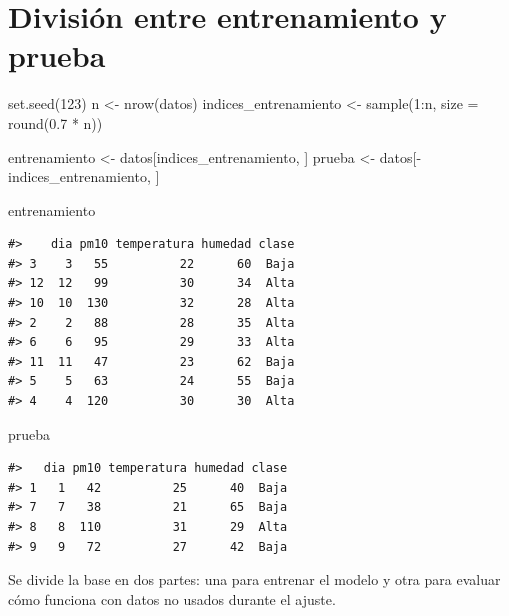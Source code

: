 \documentclass[
  spanish,
  10.5pt,
  letterpaper,
  openany,
  headings=big]{scrbook}
\newenvironment{Shaded}{}{}
\newcommand{\AttributeTok}[1]{\textcolor[rgb]{0.84,0.23,0.29}{#1}}
\newcommand{\DecValTok}[1]{\textcolor[rgb]{0.00,0.36,0.77}{#1}}
\newcommand{\FloatTok}[1]{\textcolor[rgb]{0.00,0.36,0.77}{#1}}
\newcommand{\FunctionTok}[1]{\textcolor[rgb]{0.44,0.26,0.76}{#1}}
\newcommand{\NormalTok}[1]{\textcolor[rgb]{0.14,0.16,0.18}{#1}}
\newcommand{\OtherTok}[1]{\textcolor[rgb]{0.44,0.26,0.76}{#1}}
\newcommand{\SpecialCharTok}[1]{\textcolor[rgb]{0.00,0.36,0.77}{#1}}
\begin{document}
\section{División entre entrenamiento y
prueba}\label{divisiuxf3n-entre-entrenamiento-y-prueba}

\begin{Shaded}
\begin{Highlighting}[]
\FunctionTok{set.seed}\NormalTok{(}\DecValTok{123}\NormalTok{)}
\NormalTok{n }\OtherTok{\textless{}{-}} \FunctionTok{nrow}\NormalTok{(datos)}
\NormalTok{indices\_entrenamiento }\OtherTok{\textless{}{-}} \FunctionTok{sample}\NormalTok{(}\DecValTok{1}\SpecialCharTok{:}\NormalTok{n, }\AttributeTok{size =} \FunctionTok{round}\NormalTok{(}\FloatTok{0.7} \SpecialCharTok{*}\NormalTok{ n))}

\NormalTok{entrenamiento }\OtherTok{\textless{}{-}}\NormalTok{ datos[indices\_entrenamiento, ]}
\NormalTok{prueba }\OtherTok{\textless{}{-}}\NormalTok{ datos[}\SpecialCharTok{{-}}\NormalTok{indices\_entrenamiento, ]}

\NormalTok{entrenamiento}
\end{Highlighting}
\end{Shaded}

\begin{verbatim}
#>    dia pm10 temperatura humedad clase
#> 3    3   55          22      60  Baja
#> 12  12   99          30      34  Alta
#> 10  10  130          32      28  Alta
#> 2    2   88          28      35  Alta
#> 6    6   95          29      33  Alta
#> 11  11   47          23      62  Baja
#> 5    5   63          24      55  Baja
#> 4    4  120          30      30  Alta
\end{verbatim}

\begin{Shaded}
\begin{Highlighting}[]
\NormalTok{prueba}
\end{Highlighting}
\end{Shaded}

\begin{verbatim}
#>   dia pm10 temperatura humedad clase
#> 1   1   42          25      40  Baja
#> 7   7   38          21      65  Baja
#> 8   8  110          31      29  Alta
#> 9   9   72          27      42  Baja
\end{verbatim}

\begin{tcolorbox}[enhanced jigsaw, arc=.35mm, bottomrule=.15mm, bottomtitle=1mm, breakable, colback=white, colbacktitle=quarto-callout-note-color!10!white, colframe=quarto-callout-note-color-frame, coltitle=black, left=2mm, leftrule=.75mm, opacityback=0, opacitybacktitle=0.6, rightrule=.15mm, title=\textcolor{quarto-callout-note-color}{\faInfo}\hspace{0.5em}{Explicación del código}, titlerule=0mm, toprule=.15mm, toptitle=1mm]

Se divide la base en dos partes: una para entrenar el modelo y otra para
evaluar cómo funciona con datos no usados durante el ajuste.

\end{tcolorbox}
\end{document}
